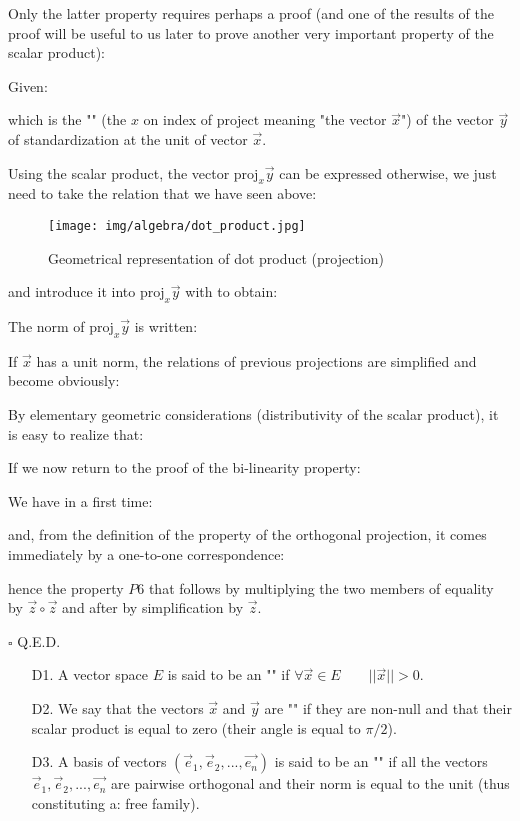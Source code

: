 	Only the latter property requires perhaps a proof (and one of the results of the proof  will be useful to us later to prove another very important property of the scalar product):
	\begin{dem}
	Given:
	
	which is the "" (the $x$ on index of $\text{project}$ meaning "the vector $\vec{x}$") of the vector $\vec{y}$ of standardization at the unit of vector $\vec{x}$.
	
	Using the scalar product, the vector $\text{proj}_x\vec{y}$ can be expressed otherwise, we just need to take the relation that we have seen above:
	\begin{figure}[H]
		\centering
		\texttt{[image: img/algebra/dot\_product.jpg]}
		\caption{Geometrical representation of dot product (projection)}
	\end{figure}
	
	and introduce it into $\text{proj}_x\vec{y}$ with to obtain:
	
	The norm of $\text{proj}_x\vec{y}$ is written:
	
	If $\vec{x}$ has a unit norm, the relations of previous projections are simplified and become obviously:
	
	By elementary geometric considerations (distributivity of the scalar product), it is easy to realize that:
	
	If we now return to the proof of the bi-linearity property:
	
	We have in a first time:
	
	and, from the definition of the property of the orthogonal projection, it comes immediately by a one-to-one correspondence:
	
	hence the property $P6$ that follows by multiplying the two members of equality by $\vec{z}\circ\vec{z}$ and after by simplification by $\vec{z}$.
	\begin{flushright}
		$\square$  Q.E.D.
	\end{flushright}
	\end{dem}
	\begin{enumerate}
		\item[D1.] A vector space $E$ is said to be an "" if $\forall \vec{x} \in E \qquad ||\vec{x}||>0$.
		
		\item[D2.] We say that the vectors $\vec{x}$ and $\vec{y}$ are "" if they are non-null and that their scalar product is equal to zero (their angle is equal to $\pi/2$).
		
		\item[D3.] A basis of vectors $(\vec{e}_1,\vec{e}_2,...,\vec{e_n})$ is said to be an "" if all the vectors $\vec{e}_1,\vec{e}_2,...,\vec{e_n}$ are pairwise orthogonal and their norm is equal to the unit (thus constituting a: free family).
	\end{enumerate}
